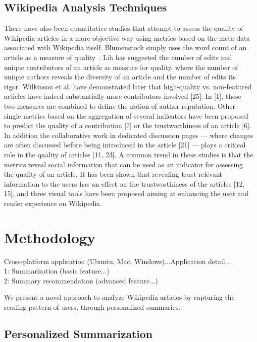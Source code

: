 \documentclass[12pt]{article}
\begin{document}
\subsection{Wikipedia Analysis Techniques}
\cite{chevalier2010wikipediaviz} There have also been quantitative studies that attempt to assess the
quality of Wikipedia articles in a more objective way using metrics based on the meta-data associated with Wikipedia itself. Blumenstock simply uses the word count of an article as a measure of
quality~\cite{blumenstock2008size}. Lih  has suggested the number of edits and unique
contributors of an article as measure for quality, where the number
of unique authors reveals the diversity of an article and the number of edits its rigor. Wilkinson et al. have demonstrated later
that high-quality vs. non-featured articles have indeed substantially
more contributors involved [25]. In [1], these two measures are
combined to define the notion of author reputation. Other single metrics based on the aggregation of several indicators have been
proposed to predict the quality of a contribution [7] or the trustworthiness of an article [6]. In addition the collaborative work in
dedicated discussion pages — where changes are often discussed
before being introduced in the article [21] — plays a critical role in
the quality of articles [11, 23].
A common trend in these studies is that the metrics reveal social
information that can be used as an indicator for assessing the quality of an article. It has been shown that revealing trust-relevant
information to the users has an effect on the trustworthiness of the
articles [12, 15], and three visual tools have been proposed aiming
at enhancing the user and reader experience on Wikipedia.



\section{Methodology}\label{sec:Proposed}

Cross-platform application (Ubuntu, Mac, Windows)...Application detail...\\
1: Summarization (basic feature...)\\
2: Summary recommendation (advanced feature...)


We present a novel approach to analyze Wikipedia articles by capturing the reading pattern of users, through personalized summaries. 

\subsection{Personalized Summarization}
\end{document}
